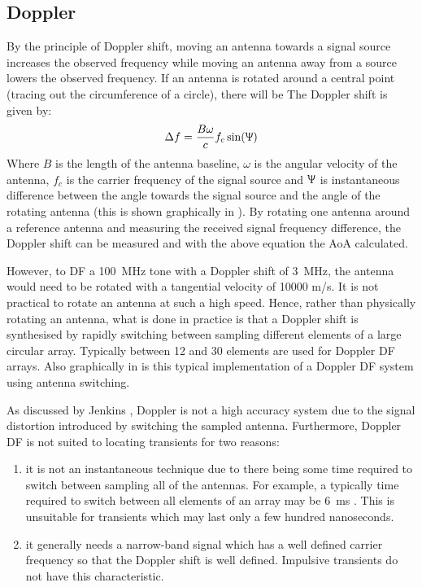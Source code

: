 \subsection{Doppler}
By the principle of Doppler shift, moving an antenna towards a signal source increases the observed frequency while moving an antenna away from a source lowers the observed frequency. 
If an antenna is rotated around a central point (tracing out the circumference of a circle), there will be 
The Doppler shift is given by: \cite{poisel2012electronic}
\begin{equation}
  \Delta f = \frac{B\omega}{c}f_c\sin(\Uppsi)
\end{equation}
Where \(B\) is the length of the antenna baseline, \(\omega\) is the angular velocity of the antenna, \(f_c\) is the carrier frequency of the signal source and \(\Uppsi\) is instantaneous difference between the angle towards the signal source and the angle of the rotating antenna (this is shown graphically in ). By rotating one antenna around a reference antenna and measuring the received signal frequency difference, the Doppler shift can be measured and with the above equation the AoA calculated.

However, to DF a \SI{100}{\mega\hertz} tone with a Doppler shift of \SI{3}{\mega\hertz}, the antenna would need to be rotated with a tangential velocity of 10000 m/s\cite{jenkins1991smallaperture}. 
It is not practical to rotate an antenna at such a high speed. 
Hence, rather than physically rotating an antenna, what is done in practice is that a Doppler shift is synthesised by rapidly switching between sampling different elements of a large circular array. 
Typically between 12 and 30 elements are used for Doppler DF arrays. 
Also graphically in  is this typical implementation of a Doppler DF system using antenna switching.

As discussed by Jenkins \cite{jenkins1991smallaperture}, Doppler is not a high accuracy system due to the signal distortion introduced by switching the sampled antenna. Furthermore, Doppler DF is not suited to locating transients for two reasons:
\begin{enumerate}
  \item it is not an instantaneous technique due to there being some time required to switch between sampling all of the antennas. For example, a typically time required to switch between all elements of an array may be \SI{6}{\milli\second} \cite{rhode2000introtodf}. This is unsuitable for transients which may last only a few hundred nanoseconds.
  \item it generally needs a narrow-band signal which has a well defined carrier frequency so that the Doppler shift is well defined. Impulsive transients do not have this characteristic.
\end{enumerate}

